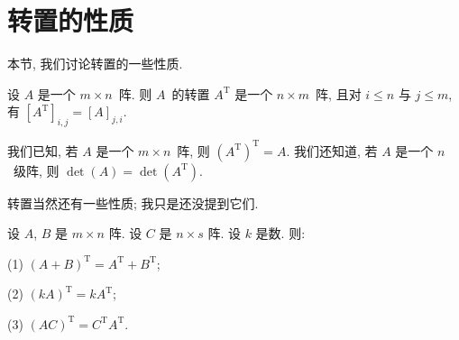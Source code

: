 \section{转置的性质}

本节, 我们讨论转置的一些性质.

设 \(A\) 是一个 \(m \times n\)~阵.
则 \(A\)~的转置 \(A^{\mathrm{T}}\) 是一个 \(n \times m\)~阵,
且对 \(i \leq n\) 与 \(j \leq m\),
有 \([A^{\mathrm{T}}]_{i,j} = [A]_{j,i}\).

我们已知, 若 \(A\) 是一个 \(m \times n\)~阵,
则 \((A^{\mathrm{T}})^{\mathrm{T}} = A\).
我们还知道, 若 \(A\) 是一个 \(n\)~级阵,
则 \(\det {(A)} = \det {(A^{\mathrm{T}})}\).

转置当然还有一些性质;
我只是还没提到它们.

\begin{theorem}
    设 \(A\), \(B\) 是 \(m \times n\) 阵.
    设 \(C\) 是 \(n \times s\) 阵.
    设 \(k\) 是数.
    则:

    (1)
    \((A + B)^{\mathrm{T}} = A^{\mathrm{T}} + B^{\mathrm{T}}\);

    (2)
    \((k A)^{\mathrm{T}} = k A^{\mathrm{T}}\);

    (3)
    \((A C)^{\mathrm{T}} = C^{\mathrm{T}} A^{\mathrm{T}}\).
\end{theorem}

